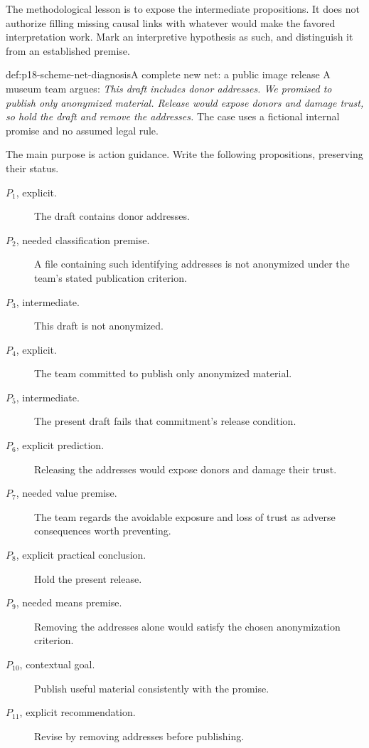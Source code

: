 The methodological lesson is to expose the intermediate propositions.
It does not authorize filling missing causal links with whatever
would make the favored interpretation work. Mark an interpretive
hypothesis as such, and distinguish it from an established premise.

\begin{hbexample}{def:p18-scheme-net-diagnosis}{A complete new net: a public image release}
A museum team argues: \emph{This draft includes donor addresses.
We promised to publish only anonymized material. Release would expose
donors and damage trust, so hold the draft and remove the addresses.}
The case uses a fictional internal promise and no assumed legal rule.

The main purpose is action guidance. Write the following propositions,
preserving their status.
\begin{description}
\item[\(P_1\), explicit.] The draft contains donor addresses.
\item[\(P_2\), needed classification premise.] A file containing such
identifying addresses is not anonymized under the team's stated
publication criterion.
\item[\(P_3\), intermediate.] This draft is not anonymized.
\item[\(P_4\), explicit.] The team committed to publish only anonymized
material.
\item[\(P_5\), intermediate.] The present draft fails that commitment's
release condition.
\item[\(P_6\), explicit prediction.] Releasing the addresses would expose
donors and damage their trust.
\item[\(P_7\), needed value premise.] The team regards the avoidable
exposure and loss of trust as adverse consequences worth preventing.
\item[\(P_8\), explicit practical conclusion.] Hold the present release.
\item[\(P_9\), needed means premise.] Removing the addresses alone
would satisfy the chosen anonymization criterion.
\item[\(P_{10}\), contextual goal.] Publish useful material consistently
with the promise.
\item[\(P_{11}\), explicit recommendation.] Revise by removing addresses
before publishing.
\end{description}


\end{hbexample}
